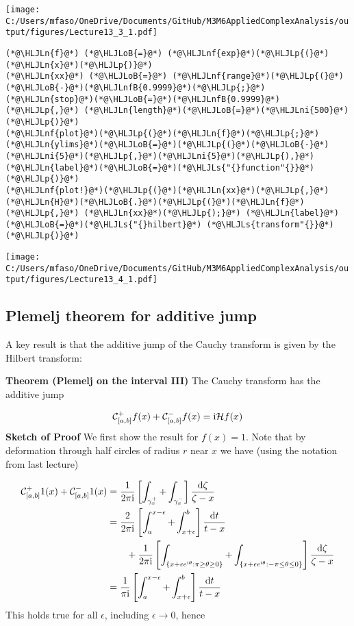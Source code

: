 \documentclass[12pt,landscape]{article}
\newcommand{\HLJLn}[1]{#1}
\newcommand{\HLJLnf}[1]{\textcolor[RGB]{66,102,213}{#1}}
\newcommand{\HLJLs}[1]{\textcolor[RGB]{201,61,57}{#1}}
\newcommand{\HLJLnfB}[1]{\textcolor[RGB]{59,151,46}{#1}}
\newcommand{\HLJLni}[1]{\textcolor[RGB]{59,151,46}{#1}}
\newcommand{\HLJLoB}[1]{\textcolor[RGB]{102,102,102}{\textbf{#1}}}
\newcommand{\HLJLp}[1]{#1}
\def\D{ {\rm d} }
\def\I{ {\rm i} }
\def\CC{ {\cal C} }
\def\HH{ {\cal H} }
\def\dt{\D t}
\def\cent#1{\begin{center}#1\end{center} }
\begin{document}
{\cent{\texttt{[image: C:/Users/mfaso/OneDrive/Documents/GitHub/M3M6AppliedComplexAnalysis/output/figures/Lecture13\_3\_1.pdf]}}
\newpage
\begin{lstlisting}
(*@\HLJLn{f}@*) (*@\HLJLoB{=}@*) (*@\HLJLnf{exp}@*)(*@\HLJLp{(}@*)(*@\HLJLn{x}@*)(*@\HLJLp{)}@*)
(*@\HLJLn{xx}@*) (*@\HLJLoB{=}@*) (*@\HLJLnf{range}@*)(*@\HLJLp{(}@*)(*@\HLJLoB{-}@*)(*@\HLJLnfB{0.9999}@*)(*@\HLJLp{;}@*) (*@\HLJLn{stop}@*)(*@\HLJLoB{=}@*)(*@\HLJLnfB{0.9999}@*)(*@\HLJLp{,}@*) (*@\HLJLn{length}@*)(*@\HLJLoB{=}@*)(*@\HLJLni{500}@*)(*@\HLJLp{)}@*)
(*@\HLJLnf{plot}@*)(*@\HLJLp{(}@*)(*@\HLJLn{f}@*)(*@\HLJLp{;}@*) (*@\HLJLn{ylims}@*)(*@\HLJLoB{=}@*)(*@\HLJLp{(}@*)(*@\HLJLoB{-}@*)(*@\HLJLni{5}@*)(*@\HLJLp{,}@*)(*@\HLJLni{5}@*)(*@\HLJLp{),}@*) (*@\HLJLn{label}@*)(*@\HLJLoB{=}@*)(*@\HLJLs{"{}function"{}}@*)(*@\HLJLp{)}@*)
(*@\HLJLnf{plot!}@*)(*@\HLJLp{(}@*)(*@\HLJLn{xx}@*)(*@\HLJLp{,}@*) (*@\HLJLn{H}@*)(*@\HLJLoB{.}@*)(*@\HLJLp{(}@*)(*@\HLJLn{f}@*)(*@\HLJLp{,}@*) (*@\HLJLn{xx}@*)(*@\HLJLp{);}@*) (*@\HLJLn{label}@*)(*@\HLJLoB{=}@*)(*@\HLJLs{"{}hilbert}@*) (*@\HLJLs{transform"{}}@*)(*@\HLJLp{)}@*)
\end{lstlisting}
\cent{\texttt{[image: C:/Users/mfaso/OneDrive/Documents/GitHub/M3M6AppliedComplexAnalysis/output/figures/Lecture13\_4\_1.pdf]}}

\subsection{Plemelj theorem for additive jump}
A key result is that the additive jump of the Cauchy transform is given by the Hilbert transform:

\textbf{Theorem (Plemelj on the interval III)} The Cauchy transform has the additive jump

\[
\CC_{[a,b]}^+ f(x) + \CC_{[a,b]}^- f(x) = \I \HH f(x)
\]
\newpage
\textbf{Sketch of Proof} We first show the result for $f(x) = 1$. Note that by deformation through half circles of radius $r$ near $x$ we have (using the notation from last lecture)


\begin{align*}
\CC_{[a,b]}^+ 1(x) + \CC_{[a,b]}^- 1(x) &= {1 \over 2 \pi\I} \left[\int_{\gamma_x^+} + \int_{\gamma_x^-} \right] {\D \zeta \over \zeta -x}  \\
        & = {2 \over 2 \pi \I} \left[ \int_a^{x-\epsilon} + \int_{x+\epsilon}^b \right] {\dt \over t - x} \cr
        & \qquad + {1 \over 2 \pi \I} \left[ \int_{\{x + \epsilon e^{\I \theta} : \pi \geq \theta \geq 0 \}} + \int_{\{x + \epsilon e^{\I \theta} : -\pi \leq \theta \leq 0 \}} \right] {\D\zeta \over \zeta - x} \\
&= {1 \over  \pi \I} \left[ \int_a^{x-\epsilon} + \int_{x+\epsilon}^b \right] {\dt \over t - x}
\end{align*}
This holds true for all $\epsilon$, including $\epsilon \rightarrow 0$, hence

}
\end{document}
